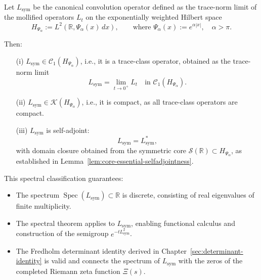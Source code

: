 \begin{theorem}
\label{thm:sa_trace_class_Lsym}
Let \( L_{\mathrm{sym}} \) be the canonical convolution operator defined as the trace-norm limit of the mollified operators \( L_t \) on the exponentially weighted Hilbert space
\[
H_{\Psi_\alpha} := L^2(\mathbb{R}, \Psi_\alpha(x)\, dx), \qquad \text{where } \Psi_\alpha(x) := e^{\alpha |x|}, \quad \alpha > \pi.
\]

Then:
\begin{enumerate}
  \item[\textnormal{(i)}] \( L_{\mathrm{sym}} \in \mathcal{C}_1(H_{\Psi_\alpha}) \), i.e., it is a trace-class operator, obtained as the trace-norm limit
  \[
  L_{\mathrm{sym}} = \lim_{t \to 0^+} L_t \quad \text{in } \mathcal{C}_1(H_{\Psi_\alpha}).
  \]

  \item[\textnormal{(ii)}] \( L_{\mathrm{sym}} \in \mathcal{K}(H_{\Psi_\alpha}) \), i.e., it is compact, as all trace-class operators are compact.

  \item[\textnormal{(iii)}] \( L_{\mathrm{sym}} \) is self-adjoint:
  \[
  L_{\mathrm{sym}} = L_{\mathrm{sym}}^*,
  \]
  with domain closure obtained from the symmetric core \( \mathcal{S}(\mathbb{R}) \subset H_{\Psi_\alpha} \), as established in Lemma~\ref{lem:core-essential-selfadjointness}.
\end{enumerate}

\medskip

\noindent
This spectral classification guarantees:
\begin{itemize}
  \item The spectrum \( \operatorname{Spec}(L_{\mathrm{sym}}) \subset \mathbb{R} \) is discrete, consisting of real eigenvalues of finite multiplicity.
  \item The spectral theorem applies to \( L_{\mathrm{sym}} \), enabling functional calculus and construction of the semigroup \( e^{-tL_{\mathrm{sym}}^2} \).
  \item The Fredholm determinant identity derived in Chapter~\ref{sec:determinant-identity} is valid and connects the spectrum of \( L_{\mathrm{sym}} \) with the zeros of the completed Riemann zeta function \( \Xi(s) \).
\end{itemize}
\end{theorem}
% 